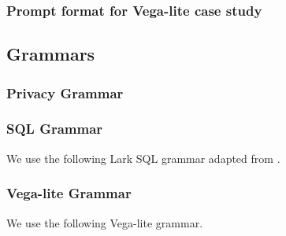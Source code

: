 \subsubsection{Prompt format for Vega-lite case study}
\label{sec:vgl_prompt}


\subsection{Grammars}
\subsubsection{Privacy Grammar}
\label{sec:priv_grammar}



\vspace{-.15in}
\subsubsection{SQL Grammar}
\label{sec:sql_grammar}

We use the following Lark SQL grammar adapted from \cite{willard2023efficient}.



\subsubsection{Vega-lite Grammar}
\label{sec:vgl_grammar}

We use the following Vega-lite grammar.

